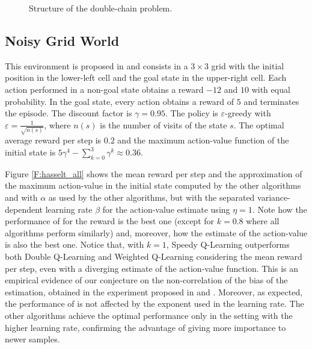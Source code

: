 \documentclass[conference]{IEEEtran}
\begin{document}
\begin{figure}[t]
\begin{center}
\end{center}
\caption{Structure of the double-chain problem.}
\label{F:double-chain}
\end{figure}
\subsection{Noisy Grid World}
This environment is proposed in \cite{van2010double} and consists in a $3 \times 3$ grid with the initial position in the lower-left cell and the goal state in the upper-right cell. Each action performed in a non-goal state obtains a reward $-12$ and $10$ with equal probability. In the goal state, every action obtains a reward of $5$ and terminates the episode. The discount factor is $\gamma = 0.95$. The policy is $\varepsilon$-greedy with $\varepsilon = \frac{1}{\sqrt{n(s)}}$, where $n(s)$ is the number of  visits of the state $s$. The optimal average reward per step is $0.2$ and the maximum action-value function of the initial state is $5\gamma^4 - \sum_{k=0}^3 \gamma^k \approx 0.36$.

Figure \ref{F:hasselt_all} shows the mean reward per step and the approximation of the maximum action-value in the initial state computed by the other algorithms and \alg with $\alpha$ as used by the other algorithms, but with the separated variance-dependent learning rate $\beta$ for the action-value estimate using $\eta = 1$. Note how the performance of \alg for the reward is the best one (except for $k=0.8$ where all algorithms perform similarly) and, moreover, how the estimate of the action-value is also the best one. Notice that, with $k=1$, Speedy Q-Learning outperforms both Double Q-Learning and Weighted Q-Learning considering the mean reward per step, even with a diverging estimate of the action-value function. This is an empirical evidence of our conjecture on the non-correlation of the bias of the estimation, obtained in the experiment proposed in \cite{van2010double} and \cite{d2016estimating}. Moreover, as expected, the performance of \alg is not affected by the exponent used in the learning rate. The other algorithms achieve the optimal performance only in the setting with the higher learning rate, confirming the advantage of giving more importance to newer samples.
\end{document}
